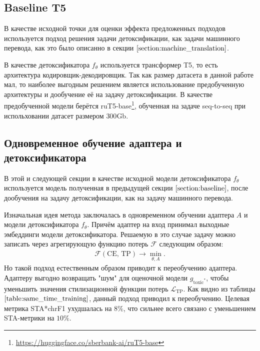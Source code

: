\subsection{Baseline T5}
\label{section:baseline}
В качестве исходной точки для оценки эффекта предложенных подходов используется подход решения задачи детоксификации, как задачи машинного перевода, как это было описанно в секции $\ref{section:machine_translation}$.


В качестве детоксификатора $f_{\theta}$ используется трансформер T5\cite{t5}, то есть архитектура кодировщик-декодировщик.
Так как размер датасета в данной работе мал, то наиболее выгодным решением является использование предобученную архитектуры и дообучение её на задачу детоксификации.
В качестве предобученной модели берётся ruT5-base\footnote{\url{https://huggingface.co/sberbank-ai/ruT5-base}}, обученная на задаче seq-to-seq при испольховании датасет размером $300$Gb. 

\subsection{Одновременное обучение адаптера и детоксификатора}
В этой и следующей секции в качестве исходной модели детоксификатора $f_{\theta}$ используется модель полученная в предыдущей секции $\ref{section:baseline}$, после дообучения на задачу детоксификации, как на задачу машинного перевода.

Изначальная идея метода заключалась в одновременном обучении адаптера $A$ и модели детоксификатора $f_{\theta}$. 
Причём адаптер на вход принимал выходные эмбеддинги модели детоксификатора.
Решаемую в это случае задачу можно записать через агрегирующую функцию потерь $\mathcal{F}$ следующим образом:
\begin{gather*}
    \mathcal{F} (\text{CE, TP}) \longrightarrow \min_{\theta, A}.
\end{gather*}
Но такой подход естественным образом приводит к переобучению адаптера.
Адаптеру выгодно возвращать "шум" для оценочной модели $g_{\text{toxic}^{*}}$, чтобы уменьшить значения стилизационной функции потерь $\mathcal{L}_{\text{TP}}$. 
Как видно из таблицы $\ref{table:same_time_training}$, данный подход приводил к переобучению.
Целевая метрика STA*chrF1 ухудшалась на $8\%$, что сильнее всего связано с уменьшением STA-метрики на $10\%$. 

